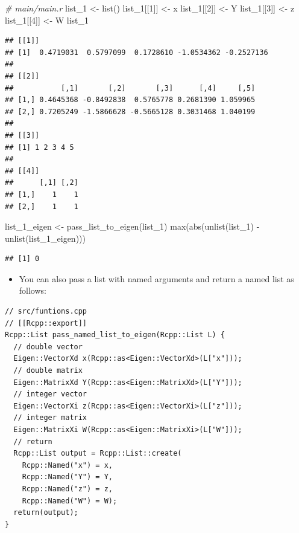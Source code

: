 \documentclass[
]{book}
\newenvironment{Shaded}{\begin{snugshade}}{\end{snugshade}}
\newcommand{\CommentTok}[1]{\textcolor[rgb]{0.56,0.35,0.01}{\textit{#1}}}
\newcommand{\DecValTok}[1]{\textcolor[rgb]{0.00,0.00,0.81}{#1}}
\newcommand{\FunctionTok}[1]{\textcolor[rgb]{0.00,0.00,0.00}{#1}}
\newcommand{\NormalTok}[1]{#1}
\newcommand{\OtherTok}[1]{\textcolor[rgb]{0.56,0.35,0.01}{#1}}
\newcommand{\SpecialCharTok}[1]{\textcolor[rgb]{0.00,0.00,0.00}{#1}}
\providecommand{\tightlist}{%
  \setlength{\itemsep}{0pt}\setlength{\parskip}{0pt}}
\begin{document}
\begin{Shaded}
\begin{Highlighting}[]
\CommentTok{\# main/main.r}
\NormalTok{list\_1 }\OtherTok{\textless{}{-}} \FunctionTok{list}\NormalTok{()}
\NormalTok{list\_1[[}\DecValTok{1}\NormalTok{]] }\OtherTok{\textless{}{-}}\NormalTok{ x}
\NormalTok{list\_1[[}\DecValTok{2}\NormalTok{]] }\OtherTok{\textless{}{-}}\NormalTok{ Y}
\NormalTok{list\_1[[}\DecValTok{3}\NormalTok{]] }\OtherTok{\textless{}{-}}\NormalTok{ z}
\NormalTok{list\_1[[}\DecValTok{4}\NormalTok{]] }\OtherTok{\textless{}{-}}\NormalTok{ W}
\NormalTok{list\_1}
\end{Highlighting}
\end{Shaded}

\begin{verbatim}
## [[1]]
## [1]  0.4719031  0.5797099  0.1728610 -1.0534362 -0.2527136
## 
## [[2]]
##           [,1]       [,2]       [,3]      [,4]     [,5]
## [1,] 0.4645368 -0.8492838  0.5765778 0.2681390 1.059965
## [2,] 0.7205249 -1.5866628 -0.5665128 0.3031468 1.040199
## 
## [[3]]
## [1] 1 2 3 4 5
## 
## [[4]]
##      [,1] [,2]
## [1,]    1    1
## [2,]    1    1
\end{verbatim}

\begin{Shaded}
\begin{Highlighting}[]
\NormalTok{list\_1\_eigen }\OtherTok{\textless{}{-}} \FunctionTok{pass\_list\_to\_eigen}\NormalTok{(list\_1)}
\FunctionTok{max}\NormalTok{(}\FunctionTok{abs}\NormalTok{(}\FunctionTok{unlist}\NormalTok{(list\_1) }\SpecialCharTok{{-}} \FunctionTok{unlist}\NormalTok{(list\_1\_eigen)))}
\end{Highlighting}
\end{Shaded}

\begin{verbatim}
## [1] 0
\end{verbatim}

\begin{itemize}
\tightlist
\item
  You can also pass a list with named arguments and return a named list as follows:
\end{itemize}

\begin{verbatim}
// src/funtions.cpp
// [[Rcpp::export]]
Rcpp::List pass_named_list_to_eigen(Rcpp::List L) {
  // double vector
  Eigen::VectorXd x(Rcpp::as<Eigen::VectorXd>(L["x"]));
  // double matrix
  Eigen::MatrixXd Y(Rcpp::as<Eigen::MatrixXd>(L["Y"]));
  // integer vector
  Eigen::VectorXi z(Rcpp::as<Eigen::VectorXi>(L["z"]));
  // integer matrix
  Eigen::MatrixXi W(Rcpp::as<Eigen::MatrixXi>(L["W"]));
  // return
  Rcpp::List output = Rcpp::List::create(
    Rcpp::Named("x") = x, 
    Rcpp::Named("Y") = Y, 
    Rcpp::Named("z") = z, 
    Rcpp::Named("W") = W);
  return(output);
}
\end{verbatim}
\end{document}
